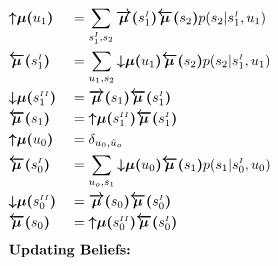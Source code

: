 \documentclass[fleqn]{article}
\begin{document}
\begin{minipage}[t]{0.5\textwidth}
    \begin{alignat}{2}
         & \bm{{\uparrow}{\mu}(}u_1\bm{)}                                      &  & = \sum_{s^{\scriptscriptstyle I}_1, s_2} \bm{\overrightarrow{\mu}(}s^{\scriptscriptstyle I}_1\bm{)} \bm{\overleftarrow{\mu}(}s_2\bm{)} p(s_2|{s^{\scriptscriptstyle I}_1},u_1) \\
         & \bm{\overleftarrow{\mu}(}s^{\scriptscriptstyle I}_1\bm{)}           &  & = \sum_{u_1, s_2} \bm{{\downarrow}{\mu}(}u_1\bm{)} \bm{\overleftarrow{\mu}(}s_2\bm{)} p(s_2|s^{\scriptscriptstyle I}_1,u_1)                                                    \\
         & \bm{{\downarrow}{\mu}(}s^{\scriptscriptstyle II}_1\bm{)}            &  & = \bm{\overrightarrow{\mu}(}s_1\bm{)} \bm{\overleftarrow{\mu}(}s^{\scriptscriptstyle I}_1\bm{)}                                                                                \\
         & \bm{\overleftarrow{\mu}(}s_1\bm{)}                                  &  & = \bm{{\uparrow}{\mu}(}s^{\scriptscriptstyle II}_1\bm{)} \bm{\overleftarrow{\mu}(}s^{\scriptscriptstyle I}_1\bm{)}                                                             \\
         & \bm{{\uparrow}{\mu}(}u_0\bm{)}                                      &  & = \delta_{u_0, \hat{u}_o}                                                                                                                                                      \\
         & \bm{\overleftarrow{\mu}(}s^{\scriptscriptstyle I}_0\bm{)}           &  & = \sum_{u_o, s_1} \bm{{\downarrow}{\mu}(}u_0\bm{)} \bm{\overleftarrow{\mu}(}s_1\bm{)} p(s_1|s^{\scriptscriptstyle I}_0,u_0)                                                    \\
         & \bm{{\downarrow}{\mu}(}s^{\scriptscriptstyle II}_0\bm{)}            &  & = \bm{\overrightarrow{\mu}(}s_0\bm{)} \bm{\overleftarrow{\mu}(}s^{\scriptscriptstyle I}_0\bm{)}                                                                                \\
         & \bm{\overleftarrow{\mu}(}s_0\bm{)}                                  &  & = \bm{{\uparrow}{\mu}(}s^{\scriptscriptstyle II}_0\bm{)} \bm{\overleftarrow{\mu}(}s^{\scriptscriptstyle I}_0\bm{)}                                                             \\[0.5em]
         & \rlap{\text{\bfseries Updating Beliefs:}} \nonumber                                                                                                                                                                                                     \\

\end{alignat}
\end{minipage}
\end{document}
